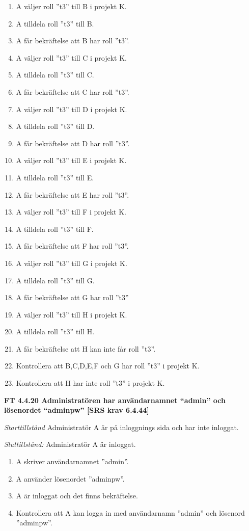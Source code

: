 \documentclass[a4paper]{article}
\begin{document}
\begin{enumerate}
\item A väljer roll ”t3” till B i projekt K. 
\item A tilldela roll ”t3” till B. 
\item A får bekräftelse att B har roll ”t3”.
\item A väljer roll ”t3” till C i projekt K. 
\item A tilldela roll ”t3” till C. 
\item A får bekräftelse att C har roll ”t3”.
\item A väljer roll ”t3” till D i projekt K. 
\item A tilldela roll ”t3” till D. 
\item A får bekräftelse att D har roll ”t3”.
\item A väljer roll ”t3” till E i projekt K. 
\item A tilldela roll ”t3” till E. 
\item A får bekräftelse att E har roll ”t3”.
\item A väljer roll ”t3” till F i projekt K.
\item A tilldela roll ”t3” till F.
\item A får bekräftelse att F har roll ”t3”.
\item A väljer roll ”t3” till G i projekt K. 
\item A tilldela roll ”t3” till G. 
\item A får bekräftelse att G har roll ”t3”
\item A väljer roll ”t3” till H i projekt K. 
\item A tilldela roll ”t3” till H. 
\item A får bekräftelse att H kan inte får roll ”t3”.
\item Kontrollera att B,C,D,E,F och G har roll ”t3” i projekt K.
\item Kontrollera att H har inte roll ”t3” i projekt K.
\end{enumerate}

\textbf{FT 4.4.20 Administratören har användarnamnet “admin” och lösenordet “adminpw” [SRS krav 6.4.44]}

\emph{Starttillstånd} Administratör A är på inloggnings sida och har inte inloggat.

\emph{Sluttillstånd:} Administratör A är inloggat.

\begin{enumerate}
\item A skriver användarnamnet ”admin”.
\item A använder lösenordet ”adminpw”.
\item A är inloggat och det finns bekräftelse.
\item Kontrollera att A kan logga in med användarnamn ”admin” och lösenord ”adminpw”.
\end{enumerate}
\end{document}
